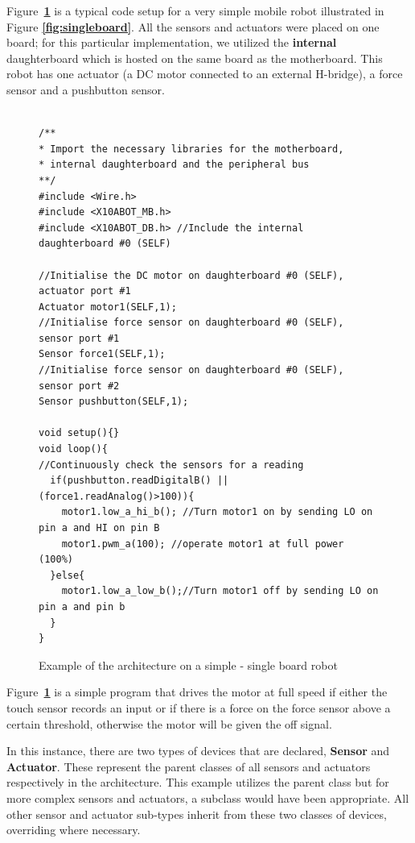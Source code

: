 Figure~\textbf{\ref{code:example}} is a typical code setup for a very simple mobile robot illustrated in Figure \textbf{\ref{fig:singleboard}}. All the sensors and actuators were placed on one board; for this particular implementation, we utilized the \textbf{internal} daughterboard which is hosted on the same board as the motherboard. This robot has one actuator (a DC motor connected to an external H-bridge), a force sensor and a pushbutton sensor.


	\begin{figure}
		\footnotesize
		\begin{verbatim}

/**
* Import the necessary libraries for the motherboard, 
* internal daughterboard and the peripheral bus
**/
#include <Wire.h>  
#include <X10ABOT_MB.h>
#include <X10ABOT_DB.h> //Include the internal daughterboard #0 (SELF)

//Initialise the DC motor on daughterboard #0 (SELF), actuator port #1
Actuator motor1(SELF,1);
//Initialise force sensor on daughterboard #0 (SELF), sensor port #1
Sensor force1(SELF,1);
//Initialise force sensor on daughterboard #0 (SELF), sensor port #2
Sensor pushbutton(SELF,1);

void setup(){}
void loop(){
//Continuously check the sensors for a reading
  if(pushbutton.readDigitalB() || (force1.readAnalog()>100)){
    motor1.low_a_hi_b(); //Turn motor1 on by sending LO on pin a and HI on pin B
    motor1.pwm_a(100); //operate motor1 at full power (100%) 
  }else{
    motor1.low_a_low_b();//Turn motor1 off by sending LO on pin a and pin b
  }
}	 
	\end{verbatim}
		\caption{Example of the \xten architecture on a simple - single board robot} \label{code:example}
	\end{figure}



Figure~\textbf{\ref{code:example}} is a simple program that drives the motor at full speed if either the touch sensor records an input or if there is a force on the force sensor above a certain threshold, otherwise the motor will be given the off signal.

In this instance, there are two types of devices that are declared, \textbf{Sensor} and \textbf{Actuator}. These represent the parent classes of all sensors and actuators respectively in the \xten architecture. This example utilizes the parent class but for more complex sensors and actuators, a subclass would have been appropriate. All other sensor and actuator sub-types inherit from these two classes of devices, overriding where necessary.

